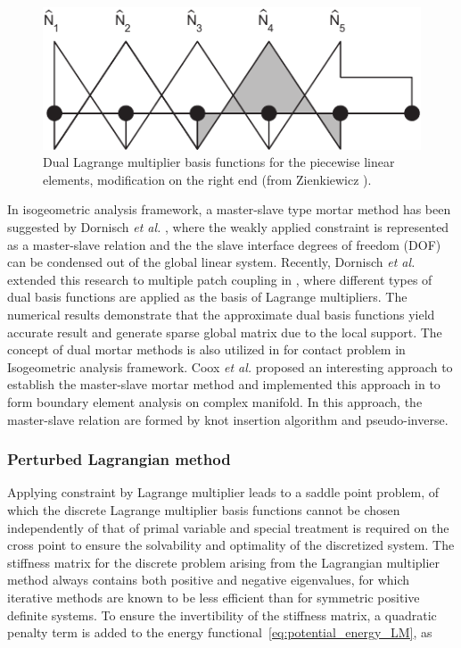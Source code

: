 \documentclass[preprint,12pt]{elsarticle}
\begin{document}
\begin{figure}
    \centering
    \includegraphics[width=.7\linewidth]{dual_mortar_basis}
    \caption{Dual Lagrange multiplier basis functions for the piecewise linear elements, modification on the right end (from Zienkiewicz \cite{zienkiewicz1977finite}).}\label{fig:dual_mortar_basis}
\end{figure}

In isogeometric analysis framework, a master-slave type mortar method has been suggested by Dornisch \textit{et al.} \cite{dornisch_weak_2015}, where the weakly applied constraint is represented as a master-slave relation and the the slave interface degrees of freedom (DOF) can be condensed out of the global linear system. Recently, Dornisch \textit{et al.} extended this research to multiple patch coupling in \cite{dornisch_patch_2016,dornisch_dual_2017}, where different types of dual basis functions are applied as the basis of Lagrange multipliers. The numerical results demonstrate that the approximate dual basis functions yield accurate result and generate sparse global matrix due to the local support. The concept of dual mortar methods is also utilized in \cite{seitz_isogeometric_2016} for contact problem in Isogeometric analysis framework. Coox \textit{et al.} \cite{coox_robust_2017} proposed an interesting approach to establish the master-slave mortar method and implemented this approach in \cite{coox_isogeometric_2017} to form boundary element analysis on complex manifold. In this approach, the master-slave relation are formed by knot insertion algorithm and pseudo-inverse. \par

\subsubsection{Perturbed Lagrangian method}
Applying constraint by Lagrange multiplier leads to a saddle point problem, of which the discrete Lagrange multiplier basis functions cannot be chosen independently of that of primal variable and special treatment is required on the cross point to ensure the solvability and optimality of the discretized system. The stiffness matrix for the discrete problem arising from the Lagrangian multiplier method always contains both positive and negative eigenvalues, for which iterative methods are known to be less efficient than for symmetric positive definite systems. To ensure the invertibility of the stiffness matrix, a quadratic penalty term is added to the energy functional~\eqref{eq:potential_energy_LM}, as
\end{document}
